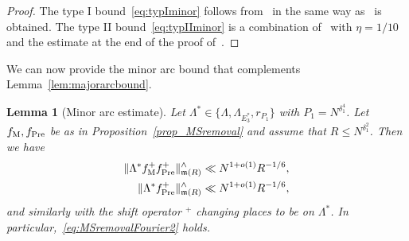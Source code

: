 \documentclass[12pt]{amsart}
\newtheorem{lemma}[theorem]{Lemma}
\theoremstyle{definition}
\theoremstyle{remark}
\numberwithin{equation}{section}
\newcommand{\1}{\mathbf{1}}
\begin{document}
\begin{proof}
The type I bound~\eqref{eq:typIminor} follows from~\cite[Lemma 6]{matomaki} in the same way as~\cite[eq. (6)]{matomaki} is obtained.  The type II bound~\eqref{eq:typIIminor} is a combination of~\cite[equation (7)]{matomaki} with $\eta=1/10$ and the estimate at the end of the proof of~\cite[Proposition 9]{matomaki}. 
\end{proof}

We can now provide the minor arc bound that complements Lemma~\ref{lem:majorarcbound}.

\begin{lemma}[Minor arc estimate]\label{lem:minor}
Let $\Lambda^{*}\in \{\Lambda, \Lambda_{E_3^{*}},r_{P_1}\}$ with $P_1=N^{\delta_1^4}$. Let $f_{\textup{M}},f_{\textup{Pre}}$ be as in Proposition~\ref{prop_MSremoval} and assume that $R\leq N^{\delta_1^2}$. Then we have
\begin{align}\label{eq:minorarcbound1}
    \|\Lambda^* f_{\textup{M}}^+ f_{\textup{Pre}}^+ \|^{\wedge}_{\mathfrak{m}(R)}&\ll N^{1+o(1)} R^{-1/6},\\
    \label{eq:minorarcbound2}  \|\Lambda^*  f_{\textup{Pre}}^+ \|^{\wedge}_{\mathfrak{m}(R)}&\ll N^{1+o(1)} R^{-1/6},
\end{align}
and similarly with the shift operator $^+$ changing places to be on $\Lambda^*$. In particular,~\eqref{eq:MSremovalFourier2} holds.

\end{lemma}
\end{document}
